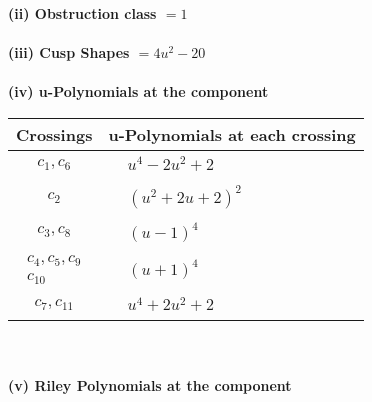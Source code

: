 \documentclass[1p]{elsarticle_modified}
\theoremstyle{definition}
\begin{document}
\flushleft \textbf{(ii) Obstruction class $= 1$}\\~\\
\flushleft \textbf{(iii) Cusp Shapes $= 4 u^2-20$}\\~\\
\newpage\renewcommand{\arraystretch}{1}
\flushleft \textbf{(iv) u-Polynomials at the component}\newline \\
\begin{tabular}{m{50pt}|m{274pt}}
Crossings & \hspace{64pt}u-Polynomials at each crossing \\
\hline $$\begin{aligned}c_{1},c_{6}\end{aligned}$$&$\begin{aligned}
&u^4-2 u^2+2
\end{aligned}$\\
\hline $$\begin{aligned}c_{2}\end{aligned}$$&$\begin{aligned}
&(u^2+2 u+2)^2
\end{aligned}$\\
\hline $$\begin{aligned}c_{3},c_{8}\end{aligned}$$&$\begin{aligned}
&(u-1)^4
\end{aligned}$\\
\hline $$\begin{aligned}c_{4},c_{5},c_{9}\\c_{10}\end{aligned}$$&$\begin{aligned}
&(u+1)^4
\end{aligned}$\\
\hline $$\begin{aligned}c_{7},c_{11}\end{aligned}$$&$\begin{aligned}
&u^4+2 u^2+2
\end{aligned}$\\
\hline
\end{tabular}\\~\\
\newpage\renewcommand{\arraystretch}{1}
\flushleft \textbf{(v) Riley Polynomials at the component}\newline \\
\end{document}
